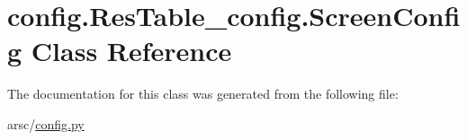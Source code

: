 \hypertarget{classconfig_1_1ResTable__config_1_1ScreenConfig}{}\section{config.\+Res\+Table\+\_\+config.\+Screen\+Config Class Reference}
\label{classconfig_1_1ResTable__config_1_1ScreenConfig}


The documentation for this class was generated from the following file\+:\begin{DoxyCompactItemize}
\item 
arsc/\mbox{\hyperlink{config_8py}{config.\+py}}\end{DoxyCompactItemize}
